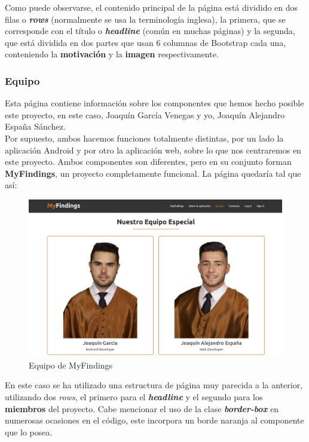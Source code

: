     Como puede observarse, el contenido principal de la página está dividido en dos filas
    o \textbf{\textit{rows}} (normalmente se usa la terminología inglesa), la primera, que
    se corresponde con el título o \textbf{\textit{headline}} (común en muchas páginas) y la
    segunda, que está dividida en dos partes que usan 6 columnas de Bootstrap cada una,
    conteniendo la \textbf{motivación} y la \textbf{imagen} respectivamente.

    \subsubsection{Equipo}
    Esta página contiene información sobre los componentes que hemos hecho posible este
    proyecto, en este caso, Joaquín García Venegas y yo, Joaquín Alejandro España Sánchez.\\
    
    Por supuesto, ambos hacemos funciones totalmente distintas, por un lado la aplicación
    Android y por otro la aplicación web, sobre lo que nos centraremos en este proyecto.
    Ambos componentes son diferentes, pero en su conjunto forman \textbf{MyFindings},
    un proyecto completamente funcional. La página quedaría tal que así:

        \begin{figure}[H]
            \centering
            \includegraphics[scale=0.23]{imagenes/team.png}
            \caption{Equipo de MyFindings}
            \label{fig:team}
        \end{figure}

    En este caso se ha utilizado una estructura de página muy parecida a la anterior, utilizando
    dos \textit{rows}, el primero para el \textbf{\textit{headline}} y el segundo para los
    \textbf{miembros} del proyecto. Cabe mencionar el uso de la clase \textbf{\textit{border-box}}
    en numerosas ocasiones en el código, este incorpora un borde naranja al componente que lo posea.

